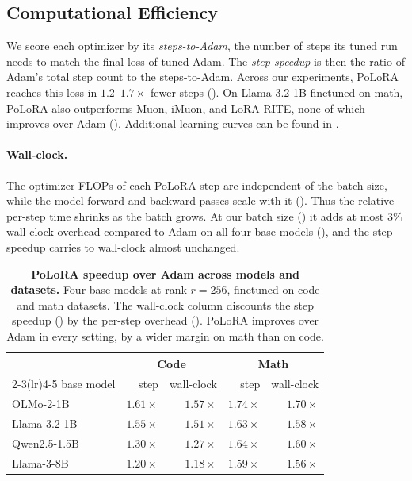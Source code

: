 \documentclass{article}
\newcommand{\methodname}{PoLoRA\xspace}
\begin{document}
\subsection{Computational Efficiency}
\label{sec:exp-main}
We score each optimizer by its \emph{steps-to-Adam}, the number of steps its tuned run needs to match the final loss of tuned Adam. The \emph{step speedup} is then the ratio of Adam's total step count to the steps-to-Adam. Across our experiments, \methodname{} reaches this loss in $1.2$--$1.7\times$ fewer steps (). On Llama-3.2-1B finetuned on math, \methodname{} also outperforms Muon, iMuon, and LoRA-RITE, none of which improves over Adam (). Additional learning curves can be found in .



\paragraph{Wall-clock.}\label{sec:exp-walltime} The optimizer FLOPs of each \methodname{} step are independent of the batch size, while the model forward
and backward passes scale with it (). Thus the relative per-step time shrinks
as the batch grows. At our batch size () it adds at most $3\%$ wall-clock overhead compared to Adam on
all four base models (), and the step speedup carries to wall-clock almost
unchanged.  

\begin{table}[t]
\centering\small
\begin{tabular}{lrrrr}
\toprule
 & \multicolumn{2}{c}{Code} & \multicolumn{2}{c}{Math} \\
\cmidrule(lr){2-3}\cmidrule(lr){4-5}
base model & step & wall-clock & step & wall-clock \\
\midrule
OLMo-2-1B & $1.61\times$ & $1.57\times$ & $1.74\times$ & $1.70\times$ \\
Llama-3.2-1B & $1.55\times$ & $1.51\times$ & $1.63\times$ & $1.58\times$ \\
Qwen2.5-1.5B & $1.30\times$ & $1.27\times$ & $1.64\times$ & $1.60\times$ \\
Llama-3-8B & $1.20\times$ & $1.18\times$ & $1.59\times$ & $1.56\times$ \\
\bottomrule
\end{tabular}
\caption{\textbf{\methodname{} speedup over Adam across models and datasets.} Four base models at rank $r=256$, finetuned on code and math datasets. The wall-clock column discounts the step speedup () by the per-step overhead (). \methodname{} improves over Adam in every setting, by a wider margin on math than on code.}
\label{tab:breadth}
\end{table}
\end{document}
